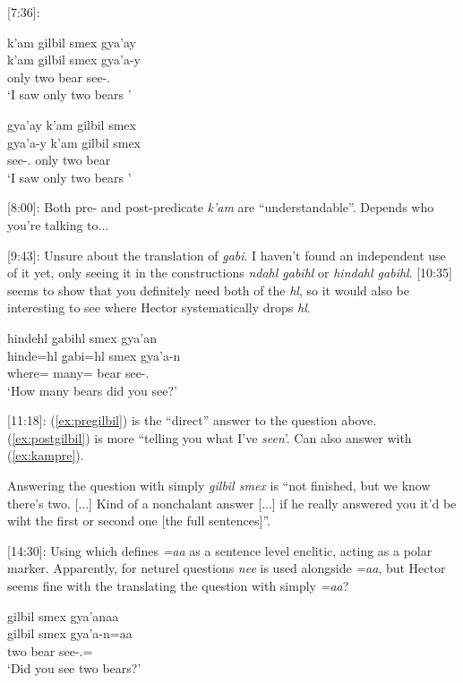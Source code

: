 [7:36]: 

\begin{exe}
    \ex \begin{xlist}
    \item \label{ex:kampre} \glll k'am gilbil smex gya'ay \\
    k'am gilbil smex gya'a-y \\
    only two bear see-\Fsg{}.\Ii{} \\
    `I saw only two bears '
    \item  \glll gya'ay k'am gilbil smex\\
    gya'a-y  k'am gilbil smex\\
    see-\Fsg{}.\Ii{} only two bear \\
    `I saw only two bears '
    \end{xlist}

\end{exe}

[8:00]: Both pre- and post-predicate \textit{k'am} are ``understandable''. Depends who you're talking to...

[9:43]: Unsure about the translation of \textit{g̱abi}. I haven't found an independent use of it yet, only seeing it in the constructions \textit{ndahl g̱abihl} or \textit{hindahl \textit{g}abihl}. [10:35] seems to show that you definitely need both of the \textit{hl}, so it would also be interesting to see where Hector systematically drops \textit{hl}.
\begin{exe}
    \ex \glll hindehl g̱abihl smex gya'an \\
    hinde=hl g̱abi=hl smex gya'a-n \\
    where=\Cn{} many=\Cn{} bear see-\Ssg{}.\Ii{} \\
    `How many bears did you see?'
\end{exe}

[11:18]: (\ref{ex:pregilbil}) is the ``direct'' answer to the question above. (\ref{ex:postgilbil}) is more ``telling you what I've \textit{seen}'. Can also answer with (\ref{ex:kampre}).

Answering the question with simply \textit{gilbil smex} is ``not finished, but we know there's two. [...] Kind of a nonchalant answer [...] if he really answered you it'd be wiht the first or second one [the full sentences]''.

[14:30]: Using \textcite[84]{davisMorphosyntaxGitksan2026} which defines \textit{=aa} as a sentence level enclitic, acting as a polar marker. Apparently, for neturel questions \textit{nee} is used alongside \textit{=aa}, but Hector seems fine with the translating the question with simply \textit{=aa}?
\begin{exe}
    \ex \glll gilbil smex gya'anaa \\
    gilbil smex gya'a-n=aa  \\
    two bear see-\Ssg{}.\Ii{}=\Q{} \\
    `Did you see two bears?'
\end{exe}

